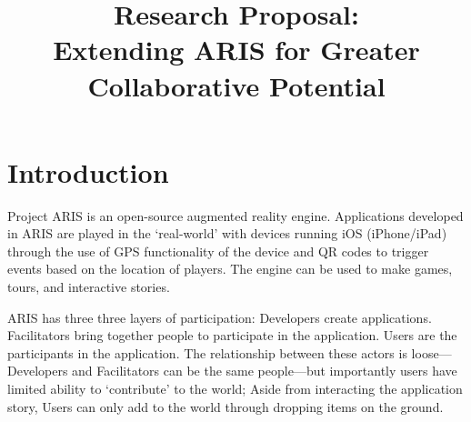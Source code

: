 \documentclass{sigchi}
\begin{document}
\title{Research Proposal: \\Extending ARIS for Greater Collaborative Potential}

\author{%
}

\maketitle




\section{Introduction}

Project ARIS is an open-source augmented reality engine. Applications developed in ARIS are played in the ‘real-world’ with devices running iOS (iPhone/iPad) through the use of GPS functionality of the device and QR codes to trigger events based on the location of players. The engine can be used to make games, tours, and interactive stories. 

ARIS has three three layers of participation: Developers create applications. Facilitators bring together people to participate in the application. Users are the participants in the application. The relationship between these actors is loose---Developers and Facilitators can be the same people---but importantly users have limited ability to ‘contribute’ to the world; Aside from interacting the application story, Users can only add to the world through dropping items on the ground.
\end{document}
